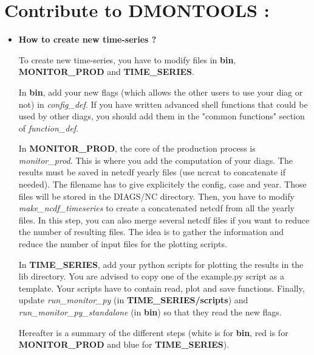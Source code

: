 \documentclass[a4paper,11pt]{article}
\begin{document}
\clearpage
\newpage

\section{Contribute to DMONTOOLS :}

\begin{itemize}

\item \textbf{How to create new time-series ?}

To create new time-series, you have to modify files in \textbf{bin}, \textbf{MONITOR\_PROD} and \textbf{TIME\_SERIES}.

In \textbf{bin}, add your new flags (which allows the other users to use your diag or not) in \textit{config\_def}. 
If you have written advanced shell functions that could be used by other diags, you should add them in the "common functions" 
section of \textit{function\_def}.

In \textbf{MONITOR\_PROD}, the core of the production process is \textit{monitor\_prod}. This is where you add
the computation of your diags.
The results must be saved in netcdf yearly files (use ncrcat to concatenate if needed). The filename has
to give explicitely the config, case and year. Those files will be stored in the DIAGS/NC directory.
Then, you have to modify \textit{make\_ncdf\_timeseries} to create a concatenated netcdf from all the yearly files.
In this step, you can also merge several netcdf files if you want to reduce the number of resulting files.
The idea is to gather the information and reduce the number of input files for the plotting scripts.

In \textbf{TIME\_SERIES}, add your python scripts for plotting the results in the lib directory. You are advised
to copy one of the example.py script as a template. Your scripts have to contain read, plot and save functions.
Finally, update \textit{run\_moni\-tor\_py} (in \textbf{TIME\_SERIES/scripts}) and 
\textit{run\_moni\-tor\_py\_stand\-alone} (in \textbf{bin}) so that they read the new flags.

Hereafter is a summary of the different steps (white is for \textbf{bin}, red is for \textbf{MONITOR\_PROD} and blue for
\textbf{TIME\_SERIES}).

\begin{center}
\begin{tikzpicture}
[node distance=.8cm,
  start chain=going below,]


\end{tikzpicture}
\end{center}
\end{itemize}
\end{document}
